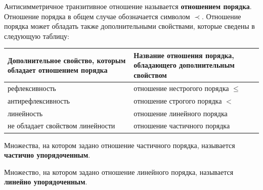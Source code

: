 Антисимметричное транзитивное отношение называется \textbf{отношением порядка}. Отношение порядка в общем случае обозначается символом \(\prec\). Отношение порядка может обладать также дополнительными свойствами, которые сведены в следующую таблицу:

\begin{center}
    \renewcommand*{\arraystretch}{1.5}
    \begin{longtable}{|C{0.45\textwidth}|C{0.45\textwidth}|}
        \hline
        Дополнительное свойство, которым обладает отношением порядка & Название отношения порядка, обладающего дополнительным свойством \\
        \hline
        рефлексивность                                               & отношение нестрогого порядка \(\leq\)                            \\
        \hline
        антирефлексивность                                           & отношение строгого порядка \(<\)                                 \\
        \hline
        линейность                                                   & отношение линейного порядка                                      \\
        \hline
        не обладает свойством линейности                             & отношение частичного порядка                                     \\
        \hline
    \end{longtable}
\end{center}

Множества, на котором задано отношение частичного порядка, называется \textbf{частично упорядоченным}.

Множество, на котором задано отношение линейного порядка, называется \textbf{линейно упорядоченным}.
